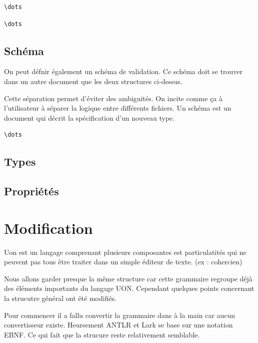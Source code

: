 \documentclass[
    iict, %
    il, %
]{heig-tb}
\begin{document}

\begin{lstlisting}[frame=single,caption={json-seq},label={json-seq}]
\dots
\end{lstlisting}


\begin{lstlisting}[frame=single,caption={yaml-seq},label={yaml-seq}]
\dots
\end{lstlisting}


\subsection{Schéma}
On peut défnir également un schéma de validation. Ce schéma doit se trouver dans un autre document que les deux structures ci-dessus.

Cette séparation permet d'éviter des ambiguités. On incite comme ça à l'utilisateur à séparer la logique entre différents fichiers.
Un schéma est un document qui décrit la spécification d'un nouveau type.

\begin{lstlisting}[frame=single,caption={yaml-seq},label={yaml-seq}]
    \dots
\end{lstlisting}


\subsection{Types}

\subsection{Propriétés}


\section{Modification}
Uon est un langage comprenant plusieurs composantes est particulatités qui ne peuvent pas tous être traiter dans un simple éditeur de texte. (ex : cohercien)
%

Nous allons garder presque la même structure car cette grammaire regroupe déjà des éléments importants du langage UON.
Cependant quelques points concernant la strucutre général ont été modifiés.

Pour commencer il a fallu convertir la grammaire dans à la main car aucun convertisseur existe. Heursement ANTLR et Lark se base sur une notation EBNF.
Ce qui fait que la strucure reste relativement semblable.
\end{document}
